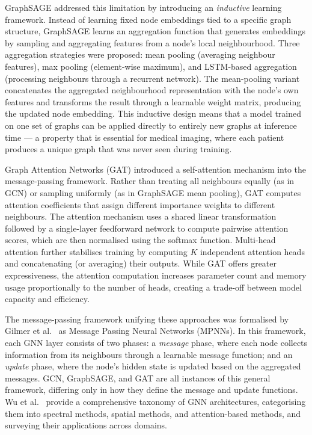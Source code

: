 \documentclass{article}
\begin{document}
GraphSAGE \cite{hamilton2017graphsage} addressed this limitation by introducing
an \textit{inductive} learning framework. Instead of learning fixed node
embeddings tied to a specific graph structure, GraphSAGE learns an aggregation
function that generates embeddings by sampling and aggregating features from a
node's local neighbourhood. Three aggregation strategies were proposed: mean
pooling (averaging neighbour features), max pooling (element-wise maximum), and
LSTM-based aggregation (processing neighbours through a recurrent network). The
mean-pooling variant concatenates the aggregated neighbourhood representation
with the node's own features and transforms the result through a learnable weight
matrix, producing the updated node embedding. This inductive design means that a
model trained on one set of graphs can be applied directly to entirely new graphs
at inference time --- a property that is essential for medical imaging, where each
patient produces a unique graph that was never seen during training.

Graph Attention Networks (GAT) \cite{velickovic2018gat} introduced a
self-attention mechanism into the message-passing framework. Rather than
treating all neighbours equally (as in GCN) or sampling uniformly (as in
GraphSAGE mean pooling), GAT computes attention coefficients that assign
different importance weights to different neighbours. The attention mechanism
uses a shared linear transformation followed by a single-layer feedforward
network to compute pairwise attention scores, which are then normalised using
the softmax function. Multi-head attention further stabilises training by
computing $K$ independent attention heads and concatenating (or averaging)
their outputs. While GAT offers greater expressiveness, the attention
computation increases parameter count and memory usage proportionally to the
number of heads, creating a trade-off between model capacity and efficiency.

The message-passing framework unifying these approaches was formalised by
Gilmer et al.\ \cite{gilmer2017neural} as Message Passing Neural Networks
(MPNNs). In this framework, each GNN layer consists of two phases: a
\textit{message} phase, where each node collects information from its
neighbours through a learnable message function; and an \textit{update}
phase, where the node's hidden state is updated based on the aggregated
messages. GCN, GraphSAGE, and GAT are all instances of this general framework,
differing only in how they define the message and update functions. Wu et al.\
\cite{wu2021comprehensive} provide a comprehensive taxonomy of GNN architectures,
categorising them into spectral methods, spatial methods, and attention-based
methods, and surveying their applications across domains.
\end{document}
